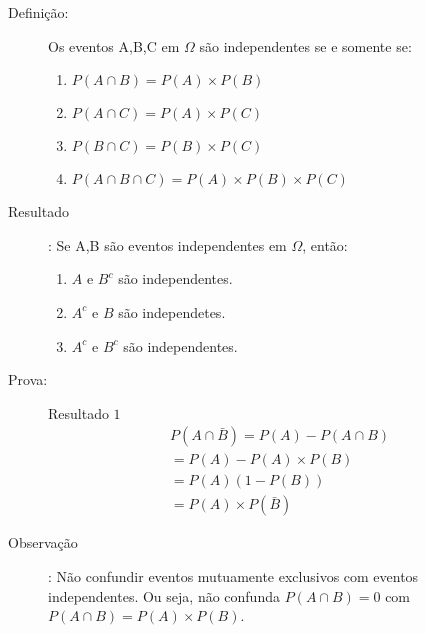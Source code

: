 \begin{description}
  \begin{description}
    \item [Definição:]Os eventos A,B,C em $\Omega$ são independentes se e somente se:

      \begin{enumerate}[label=(\alph*)]
        \item $P(A \cap B) = P(A)\times P(B)$ 

        \item $P(A \cap C) = P(A)\times P(C)$

        \item $P(B \cap C)= P(B)\times P(C)$

        \item $P(A \cap B \cap C)= P(A)\times P(B) \times P(C)$
      \end{enumerate}

    \item [Resultado]: Se A,B são eventos independentes em $\Omega$, então:

      \begin{enumerate}
        \item $A$ e $B^c$ são independentes.
        \item $A^c$ e $B$ são independetes.
        \item $A^c$ e $B^c$ são independentes.
      \end{enumerate}
      \begin{figure}[H]
        \centering
        
        \label{fig:19}
      \end{figure}
    \item[Prova:] Resultado $1$
      \begin{align*}
        P(A \cap \bar{B})= P(A) - P(A \cap B)\\
        = P(A)-P(A)\times P(B)\\
        = P(A)(1-P(B))\\
        =P(A)\times P(\bar{B})
      \end{align*}

    \item [Observação]: Não confundir eventos mutuamente exclusivos com eventos independentes. Ou seja, não confunda $P(A \cap B)  = 0$ com $ P(A \cap B) = P(A)\times P(B)$.


\end{description}
\end{description}
